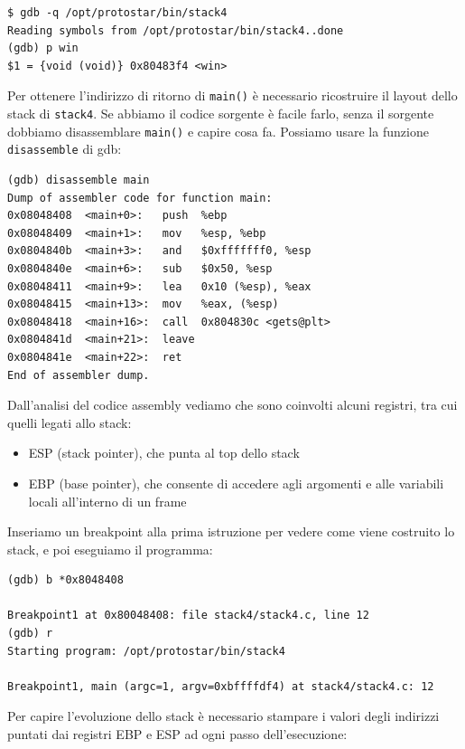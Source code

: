\begin{mdframed}[backgroundcolor=white!20,shadow=false]
\begin{lstlisting}
$ gdb -q /opt/protostar/bin/stack4
Reading symbols from /opt/protostar/bin/stack4..done
(gdb) p win
$1 = {void (void)} 0x80483f4 <win>
\end{lstlisting}
\end{mdframed}
Per ottenere l'indirizzo di ritorno di \texttt{main()} è necessario ricostruire il layout dello stack di \texttt{stack4}. Se abbiamo il codice sorgente è facile farlo, senza il sorgente dobbiamo disassemblare \texttt{main()} e capire cosa fa. Possiamo usare la funzione \texttt{disassemble} di gdb:
\begin{mdframed}[backgroundcolor=white!20,shadow=false]
\begin{lstlisting}
(gdb) disassemble main
Dump of assembler code for function main:
0x08048408  <main+0>:   push  %ebp
0x08048409  <main+1>:   mov   %esp, %ebp
0x0804840b  <main+3>:   and   $0xfffffff0, %esp
0x0804840e  <main+6>:   sub   $0x50, %esp
0x08048411  <main+9>:   lea   0x10 (%esp), %eax
0x08048415  <main+13>:  mov   %eax, (%esp)
0x08048418  <main+16>:  call  0x804830c <gets@plt>
0x0804841d  <main+21>:  leave
0x0804841e  <main+22>:  ret
End of assembler dump.
\end{lstlisting}
\end{mdframed}
Dall'analisi del codice assembly vediamo che sono coinvolti alcuni registri, tra cui quelli legati allo stack:
\begin{itemize}
    \item ESP (stack pointer), che punta al top dello stack
    \item EBP (base pointer), che consente di accedere agli argomenti e alle variabili locali all'interno di un frame
\end{itemize}
Inseriamo un breakpoint alla prima istruzione per vedere come viene costruito lo stack, e poi eseguiamo il programma:
\begin{mdframed}[backgroundcolor=white!20,shadow=false]
\begin{lstlisting}
(gdb) b *0x8048408

Breakpoint1 at 0x80048408: file stack4/stack4.c, line 12
(gdb) r
Starting program: /opt/protostar/bin/stack4

Breakpoint1, main (argc=1, argv=0xbffffdf4) at stack4/stack4.c: 12
\end{lstlisting}
\end{mdframed}
Per capire l'evoluzione dello stack è necessario stampare i valori degli indirizzi puntati dai registri EBP e ESP ad ogni passo dell'esecuzione:

